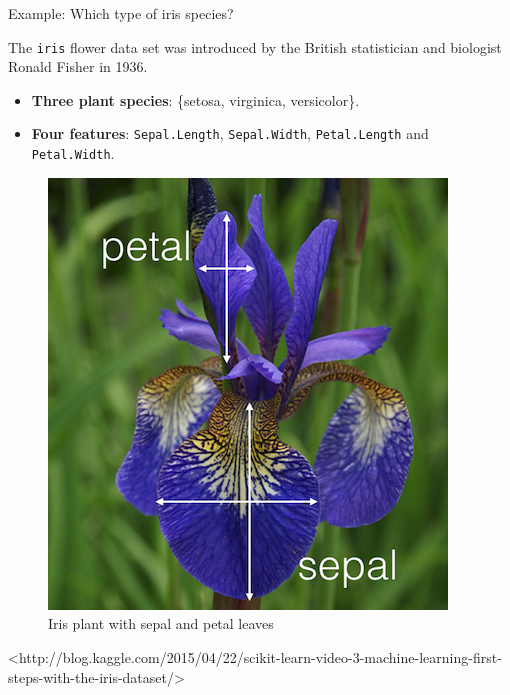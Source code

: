 \documentclass[10pt,ignorenonframetext,]{beamer}
\providecommand{\tightlist}{%
  \setlength{\itemsep}{0pt}\setlength{\parskip}{0pt}}
\begin{document}
\begin{frame}[fragile]

\begin{block}{Example: Which type of iris species?}

\vspace{2mm}

The \texttt{iris} flower data set was introduced by the British
statistician and biologist Ronald Fisher in 1936.

\begin{itemize}
\tightlist
\item
  \textbf{Three plant species}: \{setosa, virginica, versicolor\}.
\item
  \textbf{Four features}: \texttt{Sepal.Length}, \texttt{Sepal.Width},
  \texttt{Petal.Length} and \texttt{Petal.Width}.
\end{itemize}

\begin{figure}
\includegraphics[width=0.3\linewidth]{iris} \caption{Iris plant with sepal and petal leaves}\label{fig:iris_pic}
\end{figure}

\vspace{-2mm} \tiny
<http://blog.kaggle.com/2015/04/22/scikit-learn-video-3-machine-learning-first-steps-with-the-iris-dataset/>

\end{block}

\end{frame}
\end{document}
